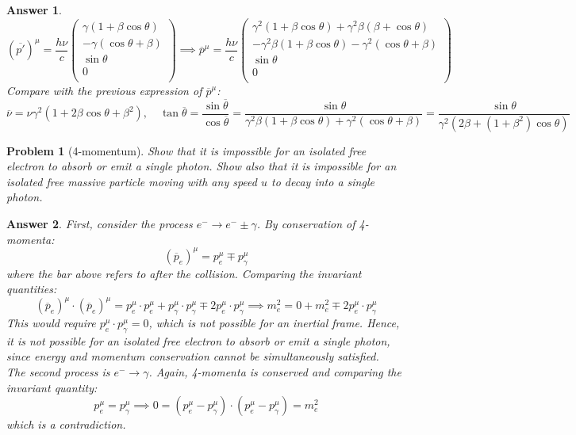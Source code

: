 \documentclass[a4paper]{article}
\theoremstyle{new2}
\newtheorem{ans}{Answer}[section]
\theoremstyle{new}
\newtheorem{qns}{Problem}[section]
\begin{document}
\begin{ans}
$$(\overline{p'})^\mu=\frac{h\nu}{c}\begin{pmatrix}\gamma(1+\beta\cos\theta)\\-\gamma(\cos\theta+\beta)\\\sin\theta\\0\\\end{pmatrix}\implies\overline{p}^\mu=\frac{h\nu}{c}\begin{pmatrix}\gamma^2(1+\beta\cos\theta)+\gamma^2\beta(\beta+\cos\theta)\\-\gamma^2\beta(1+\beta\cos\theta)-\gamma^2(\cos\theta+\beta)\\\sin\theta\\0\\\end{pmatrix}$$
Compare with the previous expression of $\overline{p}^\mu$:
$$\overline{\nu}=\nu\gamma^2(1+2\beta\cos\theta+\beta^2),\quad\tan\overline{\theta}=\frac{\sin\overline{\theta}}{\cos\overline{\theta}}=\frac{\sin\theta}{\gamma^2\beta(1+\beta\cos\theta)+\gamma^2(\cos\theta+\beta)}=\frac{\sin\theta}{\gamma^2(2\beta+(1+\beta^2)\cos\theta)}$$
\end{ans}
\begin{qns}[4-momentum]
Show that it is impossible for an isolated free electron to absorb or emit a single photon. Show also that it is impossible for an isolated free massive particle moving with any speed $u$ to decay into a single photon.
\end{qns}
\begin{ans}
First, consider the process $e^-\rightarrow e^-\pm\gamma$. By conservation of 4-momenta: 
$$(\overline{p}_e)^\mu=p_e^\mu\mp p_\gamma^\mu$$
where the bar above refers to after the collision. Comparing the invariant quantities:
$$(\overline{p}_e)^\mu\cdot(\overline{p}_e)^\mu=p_e^\mu\cdot p_e^\mu+p_\gamma^\mu\cdot p_\gamma^\mu\mp 2p_e^\mu\cdot p_\gamma^\mu\implies m_e^2=0+m_e^2\mp2 p_e^\mu\cdot p_\gamma^\mu$$
This would require $p_e^\mu\cdot p_\gamma^\mu=0$, which is not possible for an inertial frame. Hence, it is not possible for an isolated free electron to absorb or emit a single photon, since energy and momentum conservation cannot be simultaneously satisfied.\\[5pt]
The second process is $e^-\rightarrow\gamma$. Again, 4-momenta is conserved and comparing the invariant quantity:
$$p_e^\mu=p_\gamma^\mu\implies 0=(p_e^\mu-p_\gamma^\mu)\cdot(p_e^\mu-p_\gamma^\mu)=m_e^2$$
which is a contradiction. 
\end{ans}
\newpage
\end{document}

